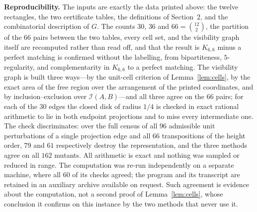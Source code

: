 \documentclass[11pt]{amsart}
\begin{document}
\medskip
\noindent
\textbf{Reproducibility.}
The inputs are exactly the data printed above: the twelve rectangles, the two
certificate tables, the definitions of Section~2, and the combinatorial
description of $G$.  The counts $30$, $36$ and $66=\binom{12}{2}$, the
partition of the $66$ pairs between the two tables, every cell set, and the
visibility graph itself are recomputed rather than read off, and that the
result is $K_{6,6}$ minus a perfect matching is confirmed without the
labelling, from bipartiteness, $5$-regularity, and complementarity in
$K_{6,6}$ to a perfect matching.  The visibility graph is built three
ways---by the unit-cell criterion of Lemma~\ref{lem:cells}, by the exact area
of the free region over the arrangement of the printed coordinates, and by
inclusion--exclusion over $\mathcal I(A,B)$---and all three agree on the $66$
pairs; for each of the $30$ edges the closed disk of radius $1/4$ is checked in
exact rational arithmetic to lie in both endpoint projections and to miss every
intermediate one.  The check discriminates: over the full census of all $96$
admissible unit perturbations of a single projection edge and all $66$
transpositions of the height order, $79$ and $61$ respectively destroy the
representation, and the
three methods agree on all $162$ mutants.  All arithmetic is exact and nothing
was sampled or reduced in range.  The computation was re-run independently on a
separate machine, where all $60$ of its checks agreed; the program and its
transcript are retained in an auxiliary archive available on request.  Such
agreement is evidence about the computation, not a second proof of
Lemma~\ref{lem:cells}, whose conclusion it confirms on this instance by the two
methods that never use it.
\end{document}
